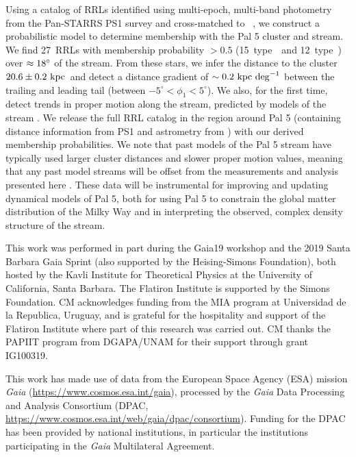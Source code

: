 \documentclass[twocolumn]{aastex63}
\newcommand{\sa}[1]{{\color{teal} SP: #1}}
\newcommand{\clderr}{\ensuremath{20.6 \pm 0.2~\kpc}}
\newcommand{\NRRL}{27}     %
\newcommand{\NRRab}{15}    %
\newcommand{\NRRc}{12}     %
\begin{document}
Using a catalog of RRLs identified using multi-epoch, multi-band photometry from the Pan-STARRS PS1 survey and cross-matched to \Gaia\ , we construct a probabilistic model to determine membership with the Pal 5 cluster and stream.
We find \NRRL\ RRLs with membership probability $>0.5$ (\NRRab\ type~\typeab\ and \NRRc\ type~\typec) over $\approx 18\mbox{$^\circ$}$ of the stream.
From these stars, we infer the distance to the cluster \clderr\ and detect a distance gradient of $\sim 0.2~\mathrm{kpc}~{\rm deg}^{-1}$ between the trailing and leading tail (between $-5^\circ < \phi_1 < 5^\circ$).
We also, for the first time, detect trends in proper motion along the stream, predicted by models of the stream \citep[e.g.,][]{Pearson:2017}.
We release the full RRL catalog in the region around Pal 5 (containing distance information from PS1 and astrometry from \Gaia) with our derived membership probabilities.
We note that past models of the Pal 5 stream have typically used larger cluster distances and slower proper motion values, meaning that any past model streams will be offset from the measurements and analysis presented here \citep[e.g.,][]{Kuepper:2015, Erkal:2017, Pearson:2017}.
These data will be instrumental for improving and updating dynamical models of Pal 5, both for using Pal 5 to constrain the global matter distribution of the Milky Way and in interpreting the observed, complex density structure of the stream.


\acknowledgments

This work was performed in part during the Gaia19 workshop and the 2019 Santa Barbara Gaia Sprint (also supported by the Heising-Simons Foundation), both hosted by the Kavli Institute for Theoretical Physics at the University of California, Santa Barbara. The Flatiron Institute is supported by the Simons Foundation. CM acknowledges funding from the MIA program at Universidad de la Republica, Uruguay, and is grateful for the hospitality and support of the Flatiron Institute where part of this research was carried out. CM thanks the PAPIIT program from DGAPA/UNAM for their support 
through grant IG100319.

This work has made use of data from the European Space Agency (ESA) mission
{\it Gaia} (\url{https://www.cosmos.esa.int/gaia}), processed by the {\it Gaia}
Data Processing and Analysis Consortium (DPAC,
\url{https://www.cosmos.esa.int/web/gaia/dpac/consortium}). Funding for the DPAC
has been provided by national institutions, in particular the institutions
participating in the {\it Gaia} Multilateral Agreement.
\end{document}
